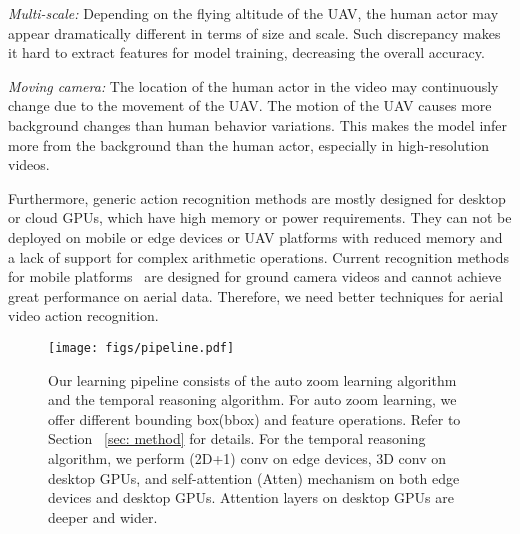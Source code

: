 \documentclass[letterpaper, 10 pt, conference]{ieeeconf}
\begin{document}
 \textit{Multi-scale:} Depending on the flying altitude of the UAV, the human actor may appear dramatically different in terms of size and scale. Such discrepancy makes it hard to extract features for model training, decreasing the overall accuracy.
 
 \textit{Moving camera:} The location of the human actor in the video may continuously change due to the movement of the UAV. The motion of the UAV causes more background changes than human behavior variations. This makes the model infer more from the background than the human actor, especially in high-resolution videos.

Furthermore, generic action recognition methods are mostly designed for desktop or cloud GPUs, which have high memory or power requirements. They can not be deployed on mobile or edge devices or UAV platforms with reduced memory and a lack of support for complex arithmetic operations.
Current recognition methods for mobile platforms~\cite{pan2022edgevits}\cite{kondratyuk2021movinets}\cite{demir2021tinyvirat} are designed for ground camera videos and cannot achieve great performance on aerial data. Therefore, we need better techniques for aerial video action recognition.


\begin{figure*}[t]
    \centering
\texttt{[image: figs/pipeline.pdf]}
        \caption{Our learning pipeline consists of the auto zoom learning algorithm and the temporal reasoning algorithm. For auto zoom learning, we offer different bounding box(bbox) and feature operations. Refer to Section ~\ref{sec: method} for details. For the temporal reasoning algorithm, we perform (2D+1) conv on edge devices,  3D conv on desktop GPUs, and self-attention (Atten) mechanism on both edge devices and desktop GPUs. Attention layers on desktop GPUs are deeper and wider. }
        \vspace{-15pt}
    \label{fig: intro}
\end{figure*}

 
\end{document}
